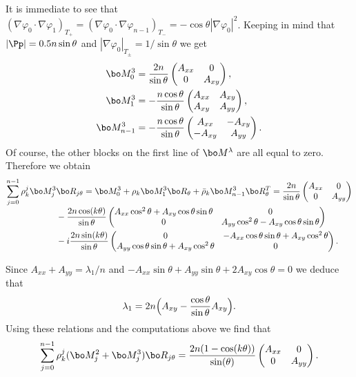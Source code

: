 It is immediate to see that $(\nabla \varphi_0\cdot \nabla \varphi_1)_{T_+} = (\nabla \varphi_0 \cdot \nabla \varphi_{n-1})_{T_-} = -\cos \theta |\nabla \varphi_0|^2$. Keeping in mind that $|\Pp| = 0.5 n \sin \theta$ and $|\nabla \varphi_0|_{T_\pm} = 1/\sin \theta$ we get\vspace*{-3pt}
\begin{align*}
\bo M_0^3 &= \frac{2n}{\sin \theta} \begin{pmatrix}
A_{xx} & 0 \\
0 & A_{xy}
\end{pmatrix},\\
\bo M_1^3 &= -\frac{n\cos \theta}{\sin \theta}\begin{pmatrix}
A_{xx} & A_{xy} \\
A_{xy} & A_{yy}
\end{pmatrix},\\
\bo M_{n-1}^3 &= -\frac{n\cos \theta}{\sin \theta} \begin{pmatrix}
A_{xx} & -A_{xy} \\
-A_{xy} & A_{yy}
\end{pmatrix}.
\end{align*}
Of course, the other blocks on the first line of $\bo M^\lambda$ are all equal to zero. Therefore we obtain\vspace*{-3pt}
\begin{align*}
\sum_{j=0}^{n-1} \rho_k^j \bo M_j^3& \bo R_{j\theta} = \bo M_0^3+ \rho_k \bo M_1^3\bo R_\theta+\bar \rho_k \bo M_{n-1}^3 \bo R_\theta^T = \frac{2n}{\sin \theta} \begin{pmatrix}
A_{xx} & 0 \\ 0 & A_{yy}
\end{pmatrix}\\[-3pt]
&-\frac{2n\cos(k\theta)}{\sin \theta}\begin{pmatrix}
A_{xx} \cos^2 \theta+A_{xy} \cos \theta \sin \theta & 0 \\
0 & A_{yy} \cos^2 \theta - A_{xy} \cos \theta \sin \theta
\end{pmatrix}\\
&-i\frac{2n\sin(k\theta)}{\sin \theta}
\begin{pmatrix}
0 & -A_{xx} \cos \theta\sin \theta+ A_{xy}\cos^2 \theta \\
A_{yy} \cos \theta\sin \theta+A_{xy}\cos^2 \theta & 0
\end{pmatrix}.
\end{align*}

Since $A_{xx}+A_{yy}=\lambda_1/n$ and $-A_{xx}\sin \theta+A_{yy}\sin \theta+2A_{xy}\cos \theta=0$ we deduce that\vspace*{-3pt}
\begin{equation}
\lambda_1 = 2n\Bigl(A_{xy}-\frac{\cos\theta}{\sin \theta}A_{xy}\Bigr).
\label{eq:criticality-tplus}
\end{equation}
Using these relations and the computations above we find that
\[
\sum_{j=0}^{n-1} \rho_k^j (\bo M_j^2+\bo M_j^3) \bo R_{j\theta}
= \frac{2n(1-\cos(k\theta))}{\sin(\theta)} \begin{pmatrix}
A_{xx} & 0 \\
0 & A_{yy}
\end{pmatrix}.
\]

